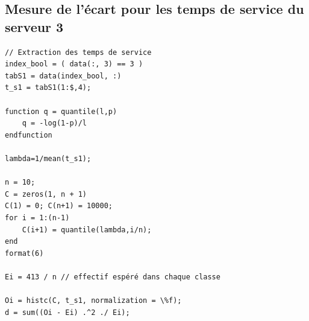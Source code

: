 \documentclass{article}
\begin{document}
 \subsection{Mesure de l'écart pour les temps de service du serveur 3}
\begin{verbatim}
// Extraction des temps de service
index_bool = ( data(:, 3) == 3 )
tabS1 = data(index_bool, :)
t_s1 = tabS1(1:$,4);

function q = quantile(l,p)
    q = -log(1-p)/l
endfunction

lambda=1/mean(t_s1);

n = 10;
C = zeros(1, n + 1)
C(1) = 0; C(n+1) = 10000; 
for i = 1:(n-1)
    C(i+1) = quantile(lambda,i/n);
end
format(6)

Ei = 413 / n // effectif espéré dans chaque classe

Oi = histc(C, t_s1, normalization = \%f);
d = sum((Oi - Ei) .^2 ./ Ei);
\end{verbatim}
\end{document}
